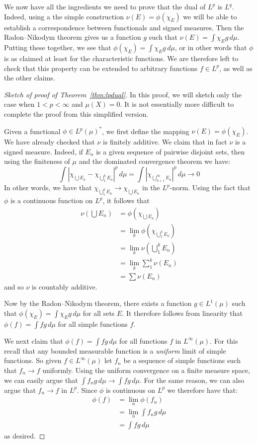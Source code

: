 \documentclass[11pt,oneside]{amsbook}
\theoremstyle{definition}
\theoremstyle{plain}
\theoremstyle{definition}
\theoremstyle{remark}
\numberwithin{equation}{section}
\numberwithin{figure}{section}
\begin{document}
We now have all the ingredients we need to prove that the dual of $L^p$ is $L^q$. Indeed, using a the simple construction $\nu(E)=\phi(\chi_E)$ we will be able to establish a correspondence between functionals and signed measures. Then the Radon--Nikodym theorem gives us a function $g$ such that $\nu(E)=\int\chi_Eg\,d\mu$. Putting these together, we see that $\phi(\chi_E)=\int\chi_Eg\,d\mu$, or in other words that $\phi$ is as claimed at least for the characteristic functions. We are therefore left to check that this property can be extended to arbitrary functions $f\in L^p$, as well as the other claims.

\begin{proof}[Sketch of proof of Theorem~\ref{thm:lpdual}]
  In this proof, we will sketch only the case when $1<p<\infty$ and $\mu(X)=0$. It is not essentially more difficult to complete the proof from this simplified version.

  Given a functional $\phi\in L^p(\mu)^*$, we first define the mapping $\nu(E)=\phi(\chi_E)$. We have already checked that $\nu$ is finitely additive. We claim that in fact $\nu$ is a signed measure. Indeed, if $E_n$ is a given sequence of pairwise disjoint sets, then using the finiteness of $\mu$ and the dominated convergence theorem we have:
  \[\int|\chi_{\bigcup E_n}-\chi_{\bigcup_1^kE_n}|^p\,d\mu
    =\int|\chi_{\bigcup_{k+1}^\infty E_n}|^p\,d\mu
    \to0
  \]
  In other words, we have that $\chi_{\bigcup_1^kE_n}\to\chi_{\bigcup E_n}$ in the $L^p$-norm. Using the fact that $\phi$ is a continuous function on $L^p$, it follows that
  \begin{align*}
    \nu(\bigcup E_n)&=\phi(\chi_{\bigcup E_n})\\
                    &=\lim_k\phi(\chi_{\bigcup_1^kE_n})\\
                    &=\lim_k\nu(\bigcup_1^kE_n)\\
                    &=\lim_k\sum_1^k\nu(E_n)\\
                    &=\sum\nu(E_n)
  \end{align*}
  and so $\nu$ is countably additive.

  Now by the Radon--Nikodym theorem, there exists a function $g\in L^1(\mu)$ such that $\phi(\chi_E)=\int\chi_Eg\,d\mu$ for all sets $E$. It therefore follows from linearity that $\phi(f)=\int fg\,d\mu$ for all simple functions $f$.

  We next claim that $\phi(f)=\int fg\,d\mu$ for all functions $f$ in $L^\infty(\mu)$. For this recall that any bounded measurable function is a \emph{uniform} limit of simple functions. So given $f\in L^\infty(\mu)$ let $f_n$ be a sequence of simple functions such that $f_n\to f$ uniformly. Using the uniform convergence on a finite measure space, we can easily argue that $\int f_ng\,d\mu\to\int fg\,d\mu$. For the same reason, we can also argue that $f_n\to f$ in $L^p$. Since $\phi$ is continuous on $L^p$ we therefore have that:
  \begin{align*}
    \phi(f)&=\lim_n\phi(f_n)\\
           &=\lim_n\int f_ng\,d\mu\\
           &=\int fg\,d\mu
  \end{align*}
  as desired.


\end{proof}
\end{document}

